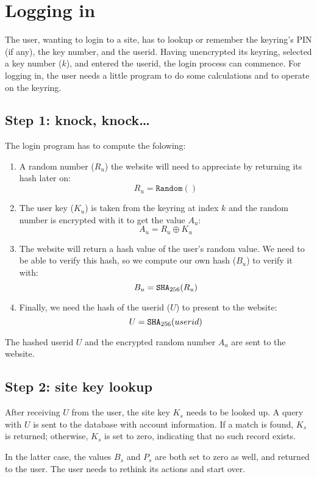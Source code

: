 \section{Logging in}
The user, wanting to login to a site, has to lookup or remember the keyring's PIN (if any), the key number, and the userid.
Having unencrypted its keyring, selected a key number ($k$), and entered the userid, the login process can commence.
For logging in, the user needs a little program to do some calculations and to operate on the keyring.

\subsection{Step 1: knock, knock\ldots}
\label{sec:login_step1}
The login program has to compute the folowing:
\begin{enumerate}
\item A random number ($R_u$) the website will need to appreciate by returning its hash later on:
\[R_u = \mathtt{Random}()\]
\item The user key ($K_u$) is taken from the keyring at index $k$ and the random number is encrypted with it to get the value $A_u$:
\[A_u = R_u \oplus K_u\]
\item The website will return a hash value of the user's random value.
We need to be able to verify this hash, so we compute our own hash ($B_u$) to verify it with:
\[B_u = \mathtt{SHA}_{256}(R_u)\]
\item Finally, we need the hash of the userid ($U$) to present to the website:
\[U=\mathtt{SHA}_{256}(userid)\]
\end{enumerate}
The hashed userid $U$ and the encrypted random number $A_u$ are sent to the website.

\subsection{Step 2: site key lookup}
\label{sec:login_step2}
After receiving $U$ from the user, the site key $K_s$ needs to be looked up.
A query with $U$ is sent to the database with account information.
If a match is found, $K_s$ is returned;
otherwise, $K_s$ is set to zero, indicating that no such record exists.
\par
In the latter case, the values $B_s$ and $P_s$ are both set to zero as well, and returned to the user.
The user needs to rethink its actions and start over.

